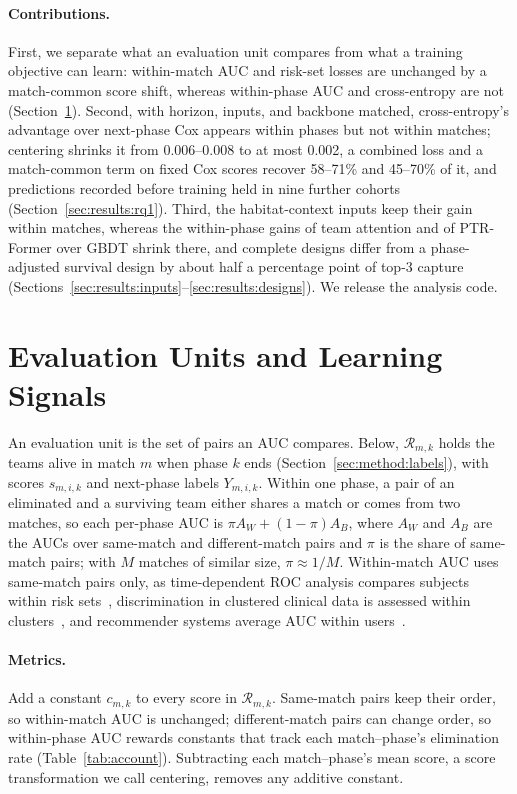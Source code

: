\documentclass[sigconf,anonymous,nonacm]{acmart}
\begin{document}
\paragraph{Contributions.}
First, we separate what an evaluation unit compares from what a training objective can learn: within-match AUC and risk-set losses are unchanged by a match-common score shift, whereas within-phase AUC and cross-entropy are not (Section~\ref{sec:account}). Second, with horizon, inputs, and backbone matched, cross-entropy's advantage over next-phase Cox appears within phases but not within matches; centering shrinks it from 0.006--0.008 to at most 0.002, a combined loss and a match-common term on fixed Cox scores recover 58--71\% and 45--70\% of it, and predictions recorded before training held in nine further cohorts (Section~\ref{sec:results:rq1}). Third, the habitat-context inputs keep their gain within matches, whereas the within-phase gains of team attention and of PTR-Former over GBDT shrink there, and complete designs differ from a phase-adjusted survival design by about half a percentage point of top-3 capture (Sections~\ref{sec:results:inputs}--\ref{sec:results:designs}). We release the analysis code.

\section{Evaluation Units and Learning Signals}
\label{sec:account}
An evaluation unit is the set of pairs an AUC compares. Below, $\mathcal{R}_{m,k}$ holds the teams alive in match $m$ when phase $k$ ends (Section~\ref{sec:method:labels}), with scores $s_{m,i,k}$ and next-phase labels $Y_{m,i,k}$. Within one phase, a pair of an eliminated and a surviving team either shares a match or comes from two matches, so each per-phase AUC is $\pi A_W+(1-\pi)A_B$, where $A_W$ and $A_B$ are the AUCs over same-match and different-match pairs and $\pi$ is the share of same-match pairs; with $M$ matches of similar size, $\pi\approx1/M$. Within-match AUC uses same-match pairs only, as time-dependent ROC analysis compares subjects within risk sets~\cite{HeagertyZheng05}, discrimination in clustered clinical data is assessed within clusters~\cite{vanKlaveren14}, and recommender systems average AUC within users~\cite{Zhou18}.

\paragraph{Metrics.}
Add a constant $c_{m,k}$ to every score in $\mathcal{R}_{m,k}$. Same-match pairs keep their order, so within-match AUC is unchanged; different-match pairs can change order, so within-phase AUC rewards constants that track each match--phase's elimination rate (Table~\ref{tab:account}). Subtracting each match--phase's mean score, a score transformation we call centering, removes any additive constant.
\end{document}
